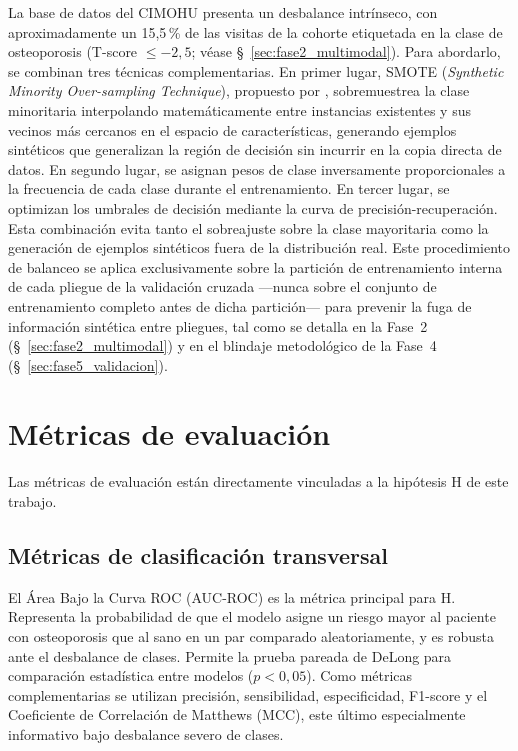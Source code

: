 \documentclass[../tesis.tex]{subfiles}
\begin{document}
La base de datos del CIMOHU presenta un desbalance intrínseco, con aproximadamente un 15{,}5\,\% de
las visitas de la cohorte etiquetada en la clase de osteoporosis (T-score $\leq -2{,}5$; véase
§~\ref{sec:fase2_multimodal}).
Para abordarlo, se combinan tres técnicas complementarias.
En primer lugar, SMOTE (\textit{Synthetic Minority Over-sampling Technique}), propuesto por
\textcite{Chawla2002}, sobremuestrea la clase minoritaria interpolando matemáticamente entre
instancias existentes y sus vecinos más cercanos en el espacio de características, generando
ejemplos sintéticos que generalizan la región de decisión sin incurrir en la copia directa de
datos.
En segundo lugar, se asignan pesos de clase inversamente proporcionales a la frecuencia de
cada clase durante el entrenamiento.
En tercer lugar, se optimizan los umbrales de decisión mediante la curva de precisión-recuperación.
Esta combinación evita tanto el sobreajuste sobre la clase mayoritaria como la generación de
ejemplos sintéticos fuera de la distribución real.
Este procedimiento de balanceo se aplica exclusivamente sobre la partición de entrenamiento interna
de cada pliegue de la validación cruzada ---nunca sobre el conjunto de entrenamiento completo antes
de dicha partición--- para prevenir la fuga de información sintética entre pliegues, tal como se
detalla en la Fase~2 (§~\ref{sec:fase2_multimodal}) y en el blindaje metodológico de la Fase~4
(§~\ref{sec:fase5_validacion}).

\section{Métricas de evaluación}
\label{sec:metricas}

Las métricas de evaluación están directamente vinculadas a la hipótesis H de este trabajo.

\subsection{Métricas de clasificación transversal}
\label{subsec:metricas_clasificacion}

El Área Bajo la Curva ROC (AUC-ROC) es la métrica principal para H.
Representa la probabilidad de que el modelo asigne un riesgo mayor al paciente con osteoporosis
que al sano en un par comparado aleatoriamente, y es robusta ante el desbalance de clases.
Permite la prueba pareada de DeLong para comparación estadística entre modelos ($p < 0{,}05$).
Como métricas complementarias se utilizan precisión, sensibilidad, especificidad, F1-score y el
Coeficiente de Correlación de Matthews (MCC), este último especialmente informativo bajo desbalance
severo de clases.
\end{document}
